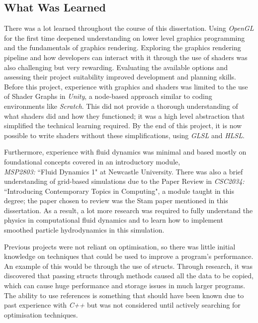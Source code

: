 \documentclass[a4paper, 12pt]{article}
\begin{document}
    \subsection{What Was Learned}

    There was a lot learned throughout the course of this dissertation. Using \textit{OpenGL} for the first time deepened understanding on lower level graphics programming and the fundamentals of graphics rendering. Exploring the graphics rendering pipeline and how developers can interact with it through the use of shaders was also challenging but very rewarding. Evaluating the available options and assessing their project suitability improved development and planning skills. Before this project, experience with graphics and shaders was limited to the use of Shader Graphs in \textit{Unity}, a node-based approach similar to coding environments like \textit{Scratch}. This did not provide a thorough understanding of what shaders did and how they functioned; it was a high level abstraction that simplified the technical learning required. By the end of this project, it is now possible to write shaders without these simplifications, using \textit{GLSL} and \textit{HLSL}.

    Furthermore, experience with fluid dynamics was minimal and based mostly on foundational concepts covered in an introductory module, \\ \emph{MSP2803:} ``Fluid Dynamics 1" at Newcastle University. There was also a brief understanding of grid-based simulations due to the Paper Review in \emph{CSC2034:} ``Introducing Contemporary Topics in Computing", a module taught in this degree; the paper chosen to review was the Stam paper mentioned in this dissertation\cite{stam}. As a result, a lot more research was required to fully understand the physics in computational fluid dynamics and to learn how to implement smoothed particle hydrodynamics in this simulation.

    Previous projects were not reliant on optimisation, so there was little initial knowledge on techniques that could be used to improve a program's performance. An example of this would be through the use of structs. Through research, it was discovered that passing structs through methods caused all the data to be copied, which can cause huge performance and storage issues in much larger programs. The ability to use references is something that should have been known due to past experience with \textit{C++} but was not considered until actively searching for optimisation techniques.
    
\end{document}
